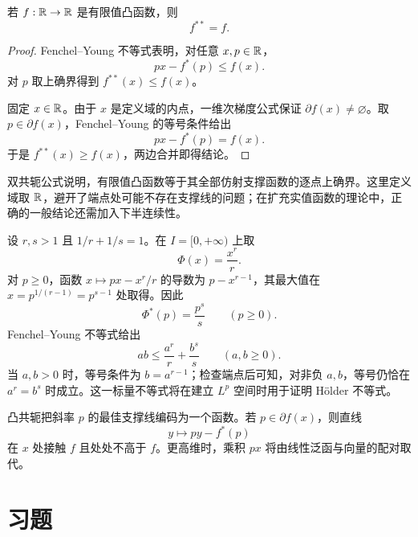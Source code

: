 \begin{theorem}[双共轭公式]
\label{thm:finite-convex-biconjugate}
若 \(f:\mathbb{R}\to\mathbb{R}\) 是有限值凸函数，则
\[
 f^{**}=f.
\]
\end{theorem}

\begin{proof}
Fenchel--Young 不等式表明，对任意 \(x,p\in\mathbb{R}\)，
\[
 px-f^*(p)\le f(x).
\]
对 \(p\) 取上确界得到 \(f^{**}(x)\le f(x)\)。

固定 \(x\in\mathbb{R}\)。由于 \(x\) 是定义域的内点，一维次梯度公式保证
\(\partial f(x)\ne\varnothing\)。取 \(p\in\partial f(x)\)，Fenchel--Young 的等号条件给出
\[
 px-f^*(p)=f(x).
\]
于是 \(f^{**}(x)\ge f(x)\)，两边合并即得结论。
\end{proof}

双共轭公式说明，有限值凸函数等于其全部仿射支撑函数的逐点上确界。这里定义域取
\(\mathbb{R}\)，避开了端点处可能不存在支撑线的问题；在扩充实值函数的理论中，正确的一般结论还需加入下半连续性。

\begin{example}
设 \(r,s>1\) 且 \(1/r+1/s=1\)。在 \(I=[0,+\infty)\) 上取
\[
 \Phi(x)=\frac{x^r}{r}.
\]
对 \(p\ge0\)，函数 \(x\mapsto px-x^r/r\) 的导数为 \(p-x^{r-1}\)，其最大值在 \(x=p^{1/(r-1)}=p^{s-1}\) 处取得。因此
\[
 \Phi^*(p)=\frac{p^s}{s}\qquad(p\ge0).
\]
Fenchel--Young 不等式给出
\begin{equation}
 ab\le\frac{a^r}{r}+\frac{b^s}{s}\qquad(a,b\ge0).
 \label{eq:young-inequality}
\end{equation}
当 \(a,b>0\) 时，等号条件为 \(b=a^{r-1}\)；检查端点后可知，对非负 \(a,b\)，等号仍恰在 \(a^r=b^s\) 时成立。这一标量不等式将在建立 \(L^p\) 空间时用于证明 H\"older 不等式。
\end{example}

凸共轭把斜率 \(p\) 的最佳支撑线编码为一个函数。若 \(p\in\partial f(x)\)，则直线
\[
 y\longmapsto py-f^*(p)
\]
在 \(x\) 处接触 \(f\) 且处处不高于 \(f\)。更高维时，乘积 \(px\) 将由线性泛函与向量的配对取代。

\section*{习题}

